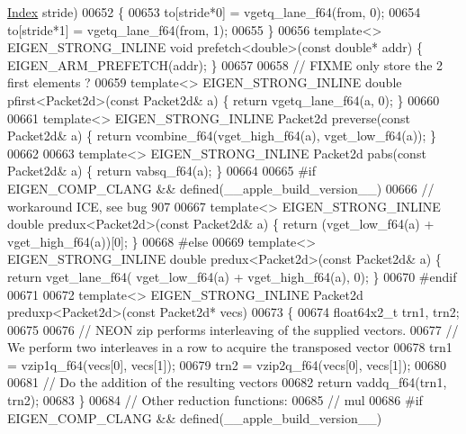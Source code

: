 \begin{DoxyCode}
{{      \hyperlink{namespace_eigen_a62e77e0933482dafde8fe197d9a2cfde}{Index} stride)
00652 \{
00653   to[stride*0] = vgetq\_lane\_f64(from, 0);
00654   to[stride*1] = vgetq\_lane\_f64(from, 1);
00655 \}
00656 \textcolor{keyword}{template}<> EIGEN\_STRONG\_INLINE \textcolor{keywordtype}{void} prefetch<double>(\textcolor{keyword}{const} \textcolor{keywordtype}{double}* addr) \{ EIGEN\_ARM\_PREFETCH(addr); \}
00657 
00658 \textcolor{comment}{// FIXME only store the 2 first elements ?}
00659 \textcolor{keyword}{template}<> EIGEN\_STRONG\_INLINE \textcolor{keywordtype}{double} pfirst<Packet2d>(\textcolor{keyword}{const} Packet2d& a) \{ \textcolor{keywordflow}{return} vgetq\_lane\_f64(a, 0); \}
00660 
00661 \textcolor{keyword}{template}<> EIGEN\_STRONG\_INLINE Packet2d preverse(\textcolor{keyword}{const} Packet2d& a) \{ \textcolor{keywordflow}{return} vcombine\_f64(vget\_high\_f64(a),
       vget\_low\_f64(a)); \}
00662 
00663 \textcolor{keyword}{template}<> EIGEN\_STRONG\_INLINE Packet2d pabs(\textcolor{keyword}{const} Packet2d& a) \{ \textcolor{keywordflow}{return} vabsq\_f64(a); \}
00664 
00665 \textcolor{preprocessor}{#if EIGEN\_COMP\_CLANG && defined(\_\_apple\_build\_version\_\_)}
00666 \textcolor{comment}{// workaround ICE, see bug 907}
00667 \textcolor{keyword}{template}<> EIGEN\_STRONG\_INLINE \textcolor{keywordtype}{double} predux<Packet2d>(\textcolor{keyword}{const} Packet2d& a) \{ \textcolor{keywordflow}{return} (vget\_low\_f64(a) + 
      vget\_high\_f64(a))[0]; \}
00668 \textcolor{preprocessor}{#else}
00669 \textcolor{keyword}{template}<> EIGEN\_STRONG\_INLINE \textcolor{keywordtype}{double} predux<Packet2d>(\textcolor{keyword}{const} Packet2d& a) \{ \textcolor{keywordflow}{return} vget\_lane\_f64(
      vget\_low\_f64(a) + vget\_high\_f64(a), 0); \}
00670 \textcolor{preprocessor}{#endif}
00671 
00672 \textcolor{keyword}{template}<> EIGEN\_STRONG\_INLINE Packet2d preduxp<Packet2d>(\textcolor{keyword}{const} Packet2d* vecs)
00673 \{
00674   float64x2\_t trn1, trn2;
00675 
00676   \textcolor{comment}{// NEON zip performs interleaving of the supplied vectors.}
00677   \textcolor{comment}{// We perform two interleaves in a row to acquire the transposed vector}
00678   trn1 = vzip1q\_f64(vecs[0], vecs[1]);
00679   trn2 = vzip2q\_f64(vecs[0], vecs[1]);
00680 
00681   \textcolor{comment}{// Do the addition of the resulting vectors}
00682   \textcolor{keywordflow}{return} vaddq\_f64(trn1, trn2);
00683 \}
00684 \textcolor{comment}{// Other reduction functions:}
00685 \textcolor{comment}{// mul}
00686 \textcolor{preprocessor}{#if EIGEN\_COMP\_CLANG && defined(\_\_apple\_build\_version\_\_)}
}}
\end{DoxyCode}
